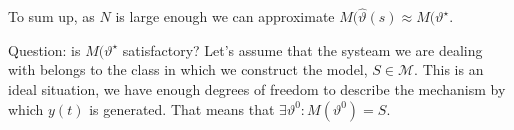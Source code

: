 To sum up, as $N$ is large enough we can approximate $M(\hat{\vartheta}(s)\approx M(\vartheta ^{\star}$.

Question: is $M(\vartheta^{\star}$ satisfactory? Let's assume that the systeam we are dealing with belongs to the class in which we construct the model, $S\in \mathcal{M}$. This is an ideal situation, we have enough degrees of freedom to describe the mechanism by which $y(t)$ is generated. That means that $\exists\vartheta^{0}: M(\vartheta^{0}) = S$.